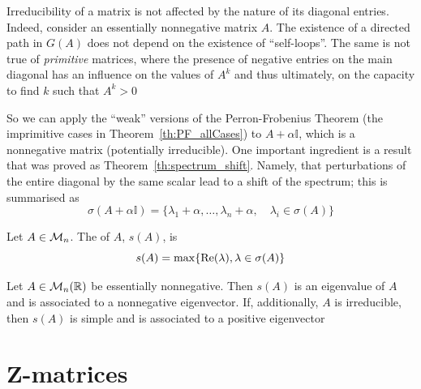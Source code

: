 \documentclass[aspectratio=169]{beamer}
\begin{document}
\begin{frame}
\begin{remark}
Irreducibility of a matrix is not affected by the nature of its diagonal entries.  Indeed, consider an essentially nonnegative matrix $A$. The existence of a directed path in $G(A)$ does not depend on the existence of ``self-loops''. The same is not true of \emph{primitive} matrices, where the presence of negative entries on the main diagonal has an influence on the values of $A^k$ and thus ultimately, on the capacity to find $k$ such that $A^k>0$
\end{remark}
\end{frame}


\begin{frame}
So we can apply the ``weak'' versions of the Perron-Frobenius Theorem (the imprimitive cases in Theorem~\ref{th:PF_allCases}) to $A+\alpha \mathbb{I}$, which is a nonnegative matrix (potentially irreducible). One important ingredient is a result that was proved as Theorem~\ref{th:spectrum_shift}. Namely, that perturbations of the entire diagonal by the same scalar lead to a shift of the spectrum; this is summarised as
\[
\sigma(A+\alpha \mathbb{I})=\{ \lambda_1+\alpha, \dots, \lambda_n+\alpha,\quad \lambda_i\in \sigma(A)\}
\]
\end{frame}



\begin{frame}
\begin{definition}
Let $A\in \mathcal{M}_n$. The  of $A$, $s(A)$, is 
\[
s(A)= \max\{\operatorname{Re}(\lambda), \lambda\in \sigma(A)\}
\]
\end{definition}
\vfill
\begin{theorem}\label{th:PF_essentially_nonneg}
Let $A\in\mathcal{M}_n(\mathbb{R})$ be essentially nonnegative. Then $s(A)$ is an eigenvalue of $A$ and is associated to a nonnegative eigenvector. If, additionally, $A$ is irreducible, then $s(A)$ is simple and is associated to a positive eigenvector
\end{theorem}
\end{frame}



\section{Z-matrices}
\label{sec:Z_matrices}
\end{document}
